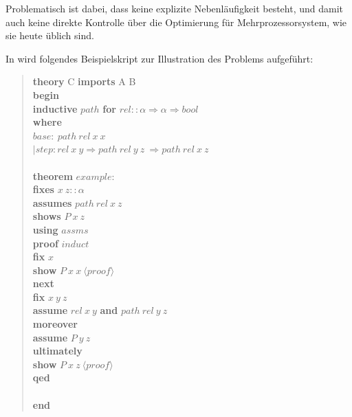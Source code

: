 Problematisch ist dabei, dass keine explizite Nebenläufigkeit besteht, und damit auch keine direkte
Kontrolle über die Optimierung für Mehrprozessorsystem, wie sie heute üblich sind.

\clearpage

In \cite{parproof} wird folgendes Beispielskript zur Illustration des Problems aufgeführt:

\begin{quote}
\textbf{theory} C \textbf{imports} A B\\
\textbf{begin}\\
\textbf{inductive} $path$ \textbf{for} $rel :: \alpha \Rightarrow \alpha \Rightarrow bool$\\
\textbf{where}\\
\hspace*{7 mm}$base:\ path\ rel\ x\ x$\\
$|$\hspace*{6 mm}$step: rel\ x\ y \Longrightarrow path\ rel\ y\ z\ \Longrightarrow path\ rel\ x\ z$\\
\\
\textbf{theorem} $example:$\\
\hspace*{7 mm}\textbf{ﬁxes} $x\ z :: \alpha$\\
\hspace*{7 mm}\textbf{assumes} $path\ rel\ x\ z$\\
\hspace*{7 mm}\textbf{shows} $P\ x\ z$\\
\textbf{using} $assms$\\
\textbf{proof} $induct$\\
\hspace*{7 mm}\textbf{ﬁx} $x$\\
\hspace*{7 mm}\textbf{show} $P\ x\ x\ \langle proof\rangle$\\
\textbf{next}\\
\hspace*{7 mm}\textbf{ﬁx} $x\ y\ z$\\
\hspace*{7 mm}\textbf{assume} $rel\ x\ y$ \textbf{and} $path\ rel\ y\ z$\\
\hspace*{7 mm}\textbf{moreover}\\
\hspace*{7 mm}\textbf{assume} $P\ y\ z$\\
\hspace*{7 mm}\textbf{ultimately}\\
\hspace*{7 mm}\textbf{show} $P\ x\ z\ \langle proof\rangle$\\
\textbf{qed}\\
\\
\textbf{end}
\end{quote}

